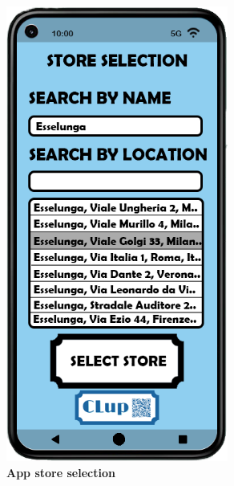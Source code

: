 \begin{itemize}
\begin{figure}[!htb]
\begin{minipage}{0.4\textwidth}
\includegraphics[width=0.65\textwidth]{Images/App/Android_StoreSelection}
\captionsetup{justification=centering}
\caption{\label{fig:androidstoreselection}\textbf{App store selection}}
\end{minipage}


\end{figure}
\end{itemize}
